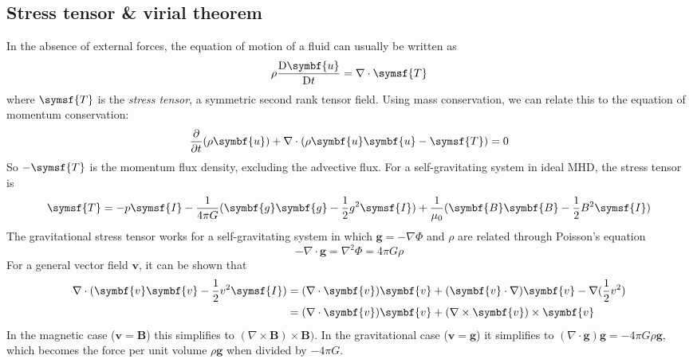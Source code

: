 \documentclass{jknotes}
\newcommand{\B}{\symbf{B}}
\renewcommand{\u}{\symbf{u}}
\begin{document}
\subsection{Stress tensor \& virial theorem}
In the absence of external forces, the equation of motion of a fluid can
usually be written as
\begin{equation}
	\rho \frac{\diffD \u}{\diffD t} = \nabla \cdot \symsf{T}
\end{equation}
where $\symsf{T}$  is the \emph{stress tensor}, a symmetric second rank tensor
field. Using mass conservation, we can relate this to the equation of momentum
conservation:
\begin{equation}
	\frac{\partial}{\partial t}(\rho \u) + \nabla \cdot (\rho \u \u -
	\symsf{T}) = 0
\end{equation}
So $-\symsf{T}$ is the momentum flux density, excluding the advective flux.
For a self-gravitating system in ideal MHD, the stress tensor is
\begin{equation}
	\symsf{T} = -p \symsf{I} - \frac{1}{4\pi G}
	(\symbf{g}\symbf{g}-\frac{1}{2}g^2 \symsf{I}) +
	\frac{1}{\mu_0}(\B\B-\frac{1}{2}B^2\symsf{I})
\end{equation}
The gravitational stress tensor works for a self-gravitating system in which
$\symbf{g} = - \nabla \Phi$ and $\rho$ are related through Poisson's equation
\begin{equation}
	-\nabla \cdot \symbf{g} = \nabla^2 \Phi = 4\pi G \rho
\end{equation}
For a general vector field $\symbf{v}$, it can be shown that
\begin{align}
	\nabla \cdot (\symbf{v}\symbf{v}-\frac{1}{2}v^2 \symsf{I}) 
	&= (\nabla \cdot \symbf{v})\symbf{v} + (\symbf{v}\cdot\nabla)\symbf{v} -
	\nabla(\frac{1}{2}v^2) \\
	&= (\nabla \cdot \symbf{v})\symbf{v} + (\nabla \times
	\symbf{v})\times\symbf{v}
\end{align}
In the magnetic case ($\symbf{v} = \B$) this simplifies to $(\nabla \times
\B)\times \B)$. In the gravitational case ($\symbf{v} = \symbf{g}$) it
simplifies to $(\nabla \cdot \symbf{g})\symbf{g} = - 4\pi G \rho \symbf{g}$,
which becomes the force per unit volume $\rho \symbf{g}$ when divided by
$-4\pi G$.
\end{document}
